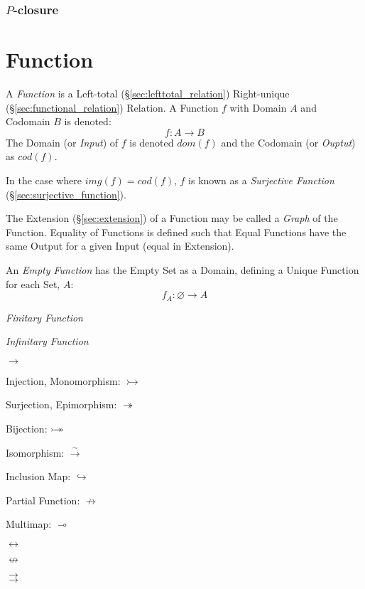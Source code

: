 \subsubsection{$P$-closure}\label{sec:p_closure}



\section{Function}\label{sec:function}

A \emph{Function} is a Left-total (\S\ref{sec:lefttotal_relation})
Right-unique (\S\ref{sec:functional_relation}) Relation. A Function
$f$ with Domain $A$ and Codomain $B$ is denoted:
\[
  f : A \rightarrow B
\]
The Domain (or \emph{Input}) of $f$ is denoted $dom(f)$ and the
Codomain (or \emph{Ouptut}) as $cod(f)$.

In the case where $img(f) = cod(f)$, $f$ is known as a
\emph{Surjective Function} (\S\ref{sec:surjective_function}).

The Extension (\S\ref{sec:extension}) of a Function may be called a
\emph{Graph} of the Function. Equality of Functions is defined such
that Equal Functions have the same Output for a given Input (equal in
Extension).

An \emph{Empty Function} has the Empty Set as a Domain, defining a
Unique Function for each Set, $A$:
\[
  f_A : \varnothing \rightarrow A
\]

\emph{Finitary Function}

\emph{Infinitary Function}

$\rightarrow$

Injection, Monomorphism: $\rightarrowtail$

Surjection, Epimorphism: $\twoheadrightarrow$

Bijection: $\rightarrowtail \hspace{-8pt} \twoheadrightarrow$

Isomorphism: $\xrightarrow{\sim}$

Inclusion Map: $\hookrightarrow$

Partial Function: $\nrightarrow$

Multimap: $\multimap$

$\leftrightarrow$

$\nleftrightarrow$

$\rightrightarrows$

